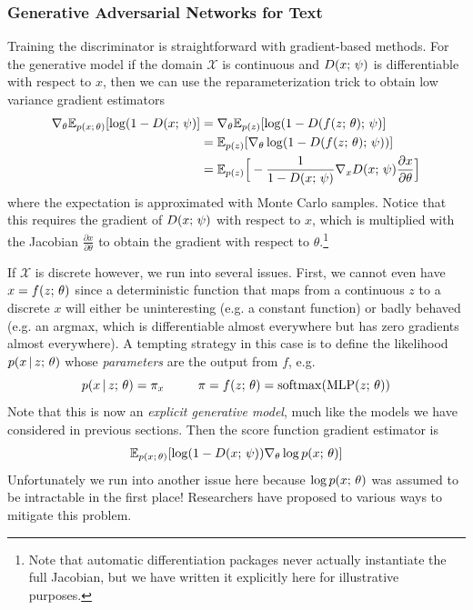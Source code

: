 \documentclass{article}
\begin{document}
\subsubsection{Generative Adversarial Networks for Text}\label{textgan}
Training the discriminator is straightforward with gradient-based methods.
For the generative model if 
the domain $\mathcal{X}$ is continuous and $D(x ; \, \psi)$ is differentiable with 
respect to $x$, then we can use the reparameterization trick to obtain low variance gradient estimators
\begin{align*}
    \nabla_\theta \mathbb{E}_{p(x ; \, \theta)}[\log(1 - D(x ; \, \psi)] &= \nabla_\theta \mathbb{E}_{p(z)} [\log(1 - D(f(z ; \, \theta) ; \, \psi)]  \\
    &= \mathbb{E}_{p(z)}[\nabla_\theta \log (1-D(f(z ; \, \theta) ; \, \psi))] \\
    &= \mathbb{E}_{p(z)}\Big[ - \frac{1}{1-D(x ; \, \psi)}  \nabla_x D(x ; \, \psi)\frac{\partial x}{\partial \theta}  \Big]
\end{align*} 
where the expectation is approximated with Monte Carlo samples. Notice that this requires
the gradient of $D(x ; \, \psi)$ with respect to $x$, which is multiplied with the Jacobian
$\frac{\partial x}{\partial \theta}$ to obtain the gradient with respect to $\theta$.\footnote{Note that automatic differentiation packages never actually instantiate the full Jacobian, but we have written it explicitly here for illustrative purposes.}

If $\mathcal{X}$ is discrete however, we run into several issues.
First, we cannot even have $x = f(z ; \, \theta)$ since a deterministic function that maps from a continuous $z$ to a discrete $x$ will either be uninteresting (e.g. a constant function)
or badly behaved (e.g. an argmax, which is differentiable almost everywhere but has zero gradients almost everywhere). A tempting strategy in this case is to define the likelihood $p(x \,|\, z ; \, \theta)$ whose \emph{parameters} are the output from $f$, e.g.
\[ p(x \,|\, z ; \, \theta) = \pi_x \,\,\,\,\,\,\,\,\,\,\,\,\,\,\,\, \pi = f(z ; \, \theta) = \operatorname*{softmax}(\operatorname*{MLP}(z ; \, \theta))\]
Note that this is now an \emph{explicit generative model}, much like the models we have considered in previous sections. Then the score function gradient estimator is
\begin{align*}
   \mathbb{E}_{p(x ; \, \theta)}[\log(1 - D(x ; \, \psi)) \nabla_\theta \log p(x ; \, \theta)] 
\end{align*}
Unfortunately we run into another issue here because $\log p(x ; \, \theta)$ was assumed to
be intractable in the first place! Researchers have proposed to various ways to mitigate this problem.
\end{document}
